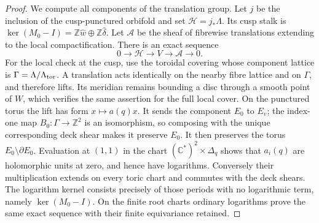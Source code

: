 \begin{proof}
We compute all components of the translation group.  Let $j$ be the
inclusion of the cusp-punctured orbifold and set
$\mathcal H=j_*\Lambda$.  Its cusp stalk is
$\ker(M_0-I)=\mathbb Z\widehat w\oplus\mathbb Z\widehat\delta$.
Let $\mathcal A$ be the sheaf of fibrewise translations extending to
the local compactification.  There is an exact sequence
\begin{equation}\label{eq:P5exponential}
0\longrightarrow\mathcal H\longrightarrow V\longrightarrow\mathcal A
\longrightarrow0.
\end{equation}
For the local check at the cusp, use the toroidal covering whose
component lattice is $\Gamma=\Lambda/\Lambda_{\rm tor}$.  A translation
acts identically on the nearby fibre lattice and on $\Gamma$, and
therefore lifts.  Its meridian remains bounding a disc through a smooth
point of $W$, which verifies the same assertion for the full local
cover.  On the punctured torus the lift has form $x\mapsto a(q)x$.
It sends the component $E_0$ to $E_v$; the index-one map
$B_0:\Gamma\to\mathbb Z^2$ is an isomorphism, so composing with the
unique corresponding deck shear makes it preserve $E_0$.  It then
preserves the torus $E_0\setminus\partial E_0$.  Evaluation at $(1,1)$
in the chart $(\mathbb C^*)^2\times\Delta_q$ shows that $a_i(q)$ are
holomorphic units at zero, and hence have logarithms.  Conversely their
multiplication extends on every toric chart and commutes with the deck
shears.  The logarithm kernel consists precisely of those periods with
no logarithmic term, namely $\ker(M_0-I)$.  On the finite root charts
ordinary logarithms prove the same exact sequence with their finite
equivariance retained.


\end{proof}
